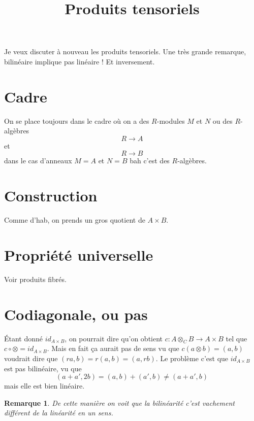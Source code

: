 \documentclass[a4paper,12pt]{article}
\title{Produits tensoriels}
\date{}
\theoremstyle{plain}
\newtheorem{rem}{Remarque}
\theoremstyle{definition}
\theoremstyle{remark}
\begin{document}
\maketitle
Je veux discuter à nouveau les produits tensoriels. Une très grande
remarque, bilinéaire implique pas linéaire ! Et inversement.

\section{Cadre}
On se place toujours dans le cadre où on a des $R$-modules $M$ et 
$N$ ou des $R$-algèbres
\[R\to A\]
et
\[R\to B\]
dans le cas d'anneaux $M=A$ et $N=B$ bah c'est des $R$-algèbres.
\section{Construction}
Comme d'hab, on prends un gros quotient de $A\times B$.
\section{Propriété universelle}
Voir produits fibrés.

\section{Codiagonale, ou pas}
Étant donné $id_{A\times B}$, on pourrait dire qu'on obtient
$c\colon A\otimes_C B \to
A\times B$ tel que $c\circ \otimes =id_{A\times B}$. Mais en fait
ça aurait pas de sens vu que $c(a\otimes b)=(a,b)$ voudrait dire
que $(ra,b)=r(a,b)=(a,rb)$. Le problème c'est que $id_{A\times B}$
est pas bilinéaire, vu que 
\[(a+a',2b)=(a,b)+(a',b)\ne (a+a',b)\]
mais elle est bien linéaire.
\begin{rem}
    De cette manière on voit que la bilinéarité c'est vachement
    différent de la linéarité en un sens.
\end{rem}
\end{document}
